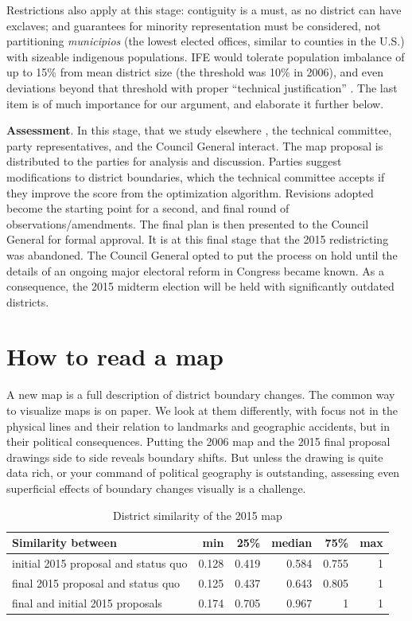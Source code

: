 \documentclass[letter,12pt]{article}
\begin{document}
Restrictions also apply at this stage: contiguity is a must, as no district can have exclaves; and guarantees for minority representation must be considered, not partitioning \emph{municipios} (the lowest elected offices, similar to counties in the U.S.) with sizeable indigenous populations. IFE would tolerate population imbalance of up to 15\% from mean district size (the threshold was 10\% in 2006), and even deviations beyond that threshold with proper ``technical justification'' \citep{ife.acuerdoRedis2013}. The last item is of much importance for our argument, and elaborate it further below.

\textbf{Assessment}. In this stage, that we study elsewhere \citep{altman.magar.mcd.trelles2014apsa}, the technical committee, party representatives, and the Council General interact. The map proposal is distributed to the parties for analysis and discussion. Parties suggest modifications to district boundaries, which the technical committee accepts if they improve the score from the optimization algorithm. Revisions adopted become the starting point for a second, and final round of observations/amendments. The final plan is then presented to the Council General for formal approval. It is at this final stage that the 2015 redistricting was abandoned. The Council General opted to put the process on hold until the details of an ongoing major electoral reform in Congress became known. As a consequence, the 2015 midterm election will be held with significantly outdated districts. 

\section{How to read a map}

A new map is a full description of district boundary changes. The common way to visualize maps is on paper. We look at them differently, with focus not in the physical lines and their relation to landmarks and geographic accidents, but in their political consequences. Putting the 2006 map and the 2015 final proposal drawings side to side reveals boundary shifts. But unless the drawing is quite data rich, or your command of political geography is outstanding, assessing even superficial effects of boundary changes visually is a challenge. 

\begin{table}
\begin{center}
  \begin{tabular}{lrrrrr}
  Similarity between                   &   min  &  25\%  & median &  75\% &  max \\ \hline
  initial 2015 proposal and status quo & 0.128  & 0.419  & 0.584  & 0.755 &  1   \\
  final 2015 proposal and status quo   & 0.125  & 0.437  & 0.643  & 0.805 &  1   \\
  final and initial 2015 proposals     & 0.174  & 0.705  & 0.967  & 1     &  1   \\
  \end{tabular}
  \caption{District similarity of the 2015 map}\label{T:simIndex}
\end{center}
\end{table}
\end{document}
